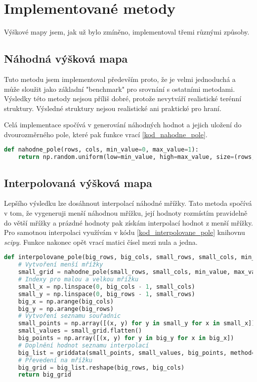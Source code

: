 \section{Implementované metody}

Výškové mapy jsem, jak už bylo zmíněno, implementoval třemi různými způsoby.

\subsection{Náhodná výšková mapa}

Tuto metodu jsem implementoval především proto, že je velmi jednoduchá a může sloužit jako základní "benchmark" pro srovnání s ostatními metodami. Výsledky této metody nejsou příliš dobré, protože nevytváří realistické terénní struktury. Výsledné struktury nejsou realistické ani praktické pro hraní.

Celá implementace spočívá v generování náhodných hodnot a jejich uložení do dvourozměrného pole, které pak funkce vrací \ref{kod_nahodne_pole}.


\begin{lstlisting}[language=Python, caption=Kód generující pole pro náhodnou mapu, label=kod_nahodne_pole]
def nahodne_pole(rows, cols, min_value=0, max_value=1):
    return np.random.uniform(low=min_value, high=max_value, size=(rows, cols))

\end{lstlisting}


\subsection{Interpolovaná výšková mapa}

Lepšího výsledku lze dosáhnout interpolací náhodné mřížky. Tato metoda spočívá v tom, že vygeneruji menší náhodnou mřížku, její hodnoty rozmístím pravidelně do větší mřížky a prázdné hodnoty pak získám interpolací hodnot z menší mřížky. Pro samotnou interpolaci využívám v kódu \ref{kod_interpolovane_pole} knihovnu \textit{scipy}. Funkce nakonec opět vrací matici čísel mezi nula a jedna.

\begin{lstlisting}[language=Python, caption=Kód generující iterpolovanou výškovou mapu, label=kod_interpolovane_pole]
def interpolovane_pole(big_rows, big_cols, small_rows, small_cols, min_value=0, max_value=1):
    # Vytvoření menší mřížky
    small_grid = nahodne_pole(small_rows, small_cols, min_value, max_value)
    # Indexy pro malou a velkou mřížku
    small_x = np.linspace(0, big_cols - 1, small_cols)
    small_y = np.linspace(0, big_rows - 1, small_rows)
    big_x = np.arange(big_cols)
    big_y = np.arange(big_rows)
    # Vytvoření seznamu souřadnic
    small_points = np.array([(x, y) for y in small_y for x in small_x])
    small_values = small_grid.flatten()
    big_points = np.array([(x, y) for y in big_y for x in big_x])
    # Doplnění hodnot seznamu interpolací
    big_list = griddata(small_points, small_values, big_points, method='cubic')
    # Převedení na mřížku
    big_grid = big_list.reshape(big_rows, big_cols)
    return big_grid

\end{lstlisting}

